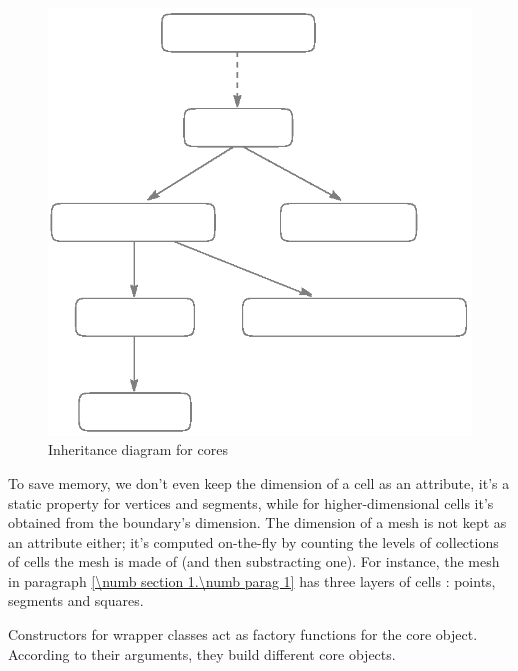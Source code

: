 \begin{figure}[ht] \centering
 \includegraphics{diagr-mesh-rev}
 \caption{Inheritance diagram for {\small\tt{}} cores}
 \label{\numb section 11.\numb fig 2}
\end{figure}

To save memory, we don't even keep the dimension of a cell as an attribute,
it's a static property for vertices and segments, while for higher-dimensional cells
it's obtained from the boundary's dimension.
The dimension of a mesh is not kept as an attribute either; it's computed on-the-fly
by counting the levels of collections of cells the mesh is made of (and then
substracting one).
For instance, the mesh in paragraph \ref{\numb section 1.\numb parag 1} has three layers
of cells : points, segments and squares.

Constructors for wrapper classes act as factory functions for the core object.
According to their arguments, they build different core objects.

